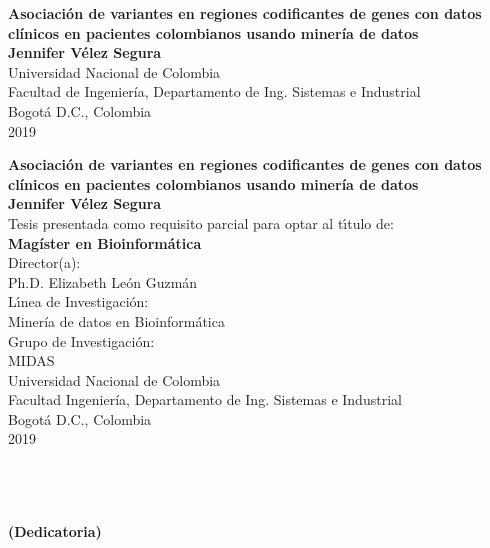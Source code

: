 \begin{center}
\begin{figure}
\centering%
\end{figure}
\thispagestyle{empty} \vspace*{0cm} \textbf{\huge
Asociación de variantes en regiones codificantes de genes con datos clínicos en
pacientes colombianos usando minería de datos}\\[5.0cm]
\Large\textbf{Jennifer Vélez Segura}\\[5.0cm]
\small Universidad Nacional de Colombia\\
Facultad de Ingeniería, Departamento de Ing. Sistemas e Industrial\\
Bogotá D.C., Colombia\\
2019\\
\end{center}

\newpage{\pagestyle{empty}\cleardoublepage}

\newpage
\begin{center}
\thispagestyle{empty} \vspace*{0cm} \textbf{\huge
Asociación de variantes en regiones codificantes de genes con datos clínicos en
pacientes colombianos usando minería de datos}\\[2.0cm]
\Large\textbf{Jennifer Vélez Segura}\\[2.0cm]
\small Tesis presentada como requisito parcial para optar al
t\'{\i}tulo de:\\
\textbf{Magíster en Bioinformática}\\[2.5cm]
Director(a):\\
Ph.D. Elizabeth León Guzmán\\[2.0cm]
L\'{\i}nea de Investigaci\'{o}n:\\
Minería de datos en Bioinformática\\
Grupo de Investigaci\'{o}n:\\
MIDAS\\[2.5cm]
Universidad Nacional de Colombia\\
Facultad Ingeniería, Departamento de Ing. Sistemas e Industrial\\
Bogotá D.C., Colombia\\
2019 \\
\end{center}

\newpage{\pagestyle{empty}\cleardoublepage}

\newpage
\thispagestyle{empty} \textbf{}\normalsize
\\\\\\%
\textbf{(Dedicatoria)}\\[4.0cm]

